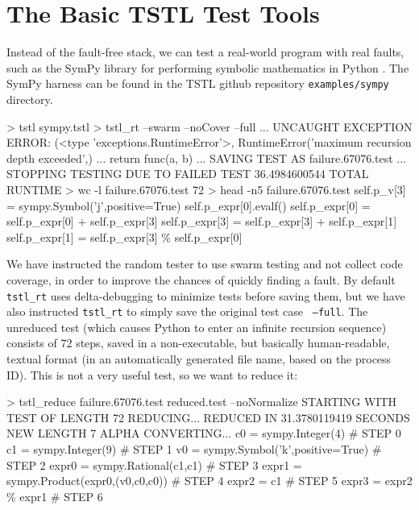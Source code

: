 \section{The Basic TSTL Test Tools}

Instead of the fault-free stack, we can test a real-world program with real faults, such as the SymPy library for performing symbolic mathematics in Python \cite{SymPy}.  The SymPy harness can be found in the TSTL github repository {\tt examples/sympy} directory.

{\scriptsize
\begin{code}
 > tstl sympy.tstl
 > tstl\_rt --swarm --noCover --full
...
 UNCAUGHT EXCEPTION
 ERROR: (<type 'exceptions.RuntimeError'>,
 RuntimeError('maximum recursion depth exceeded',)
...
    return func(a, b)
...
 SAVING TEST AS failure.67076.test
...
 STOPPING TESTING DUE TO FAILED TEST
 36.4984600544 TOTAL RUNTIME
 > wc -l failure.67076.test
 72
 > head -n5 failure.67076.test
 self.p\_v[3] = sympy.Symbol('j',positive=True) 
 self.p\_expr[0].evalf() 
 self.p\_expr[0] = self.p\_expr[0] + self.p\_expr[3] 
 self.p\_expr[3] = self.p\_expr[3] + self.p\_expr[1] 
 self.p\_expr[1] = self.p\_expr[3] \% self.p\_expr[0] 

\end{code}
}

We have instructed the random tester to use swarm testing
\cite{ISSTA12} and not collect code coverage, in order to improve the
chances of quickly finding a fault.  By default {\tt tstl\_rt} uses
delta-debugging to minimize tests before saving them, but we have
also instructed {\tt tstl\_rt} to simply save the original test case {\tt
  --full}.  The unreduced test (which causes Python to enter an
infinite recursion sequence) consists of 72 steps, saved in a
non-executable, but basically human-readable, textual
format (in an automatically generated file name, based on the process ID).  This is not a very useful test, so we want to reduce
it:

{\scriptsize
\begin{code}
 > tstl\_reduce failure.67076.test reduced.test --noNormalize
 STARTING WITH TEST OF LENGTH 72
 REDUCING...
 REDUCED IN 31.3780119419 SECONDS
 NEW LENGTH 7
 ALPHA CONVERTING...
 c0 = sympy.Integer(4)                            \# STEP 0
 c1 = sympy.Integer(9)                            \# STEP 1
 v0 = sympy.Symbol('k',positive=True)             \# STEP 2
 expr0 = sympy.Rational(c1,c1)                    \# STEP 3
 expr1 = sympy.Product(expr0,(v0,c0,c0))          \# STEP 4
 expr2 = c1                                       \# STEP 5
 expr3 = expr2 \% expr1                            \# STEP 6
\end{code}
}

